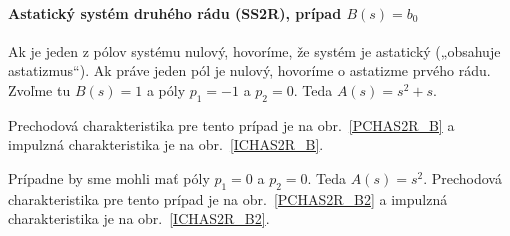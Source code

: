\documentclass[a4paper, 10pt, ]{article}
\begin{document}
\paragraph{Astatický systém druhého rádu (SS2R), prípad $B(s) = b_0$}

Ak je jeden z pólov systému nulový, hovoríme, že systém je astatický („obsahuje astatizmus“). Ak práve jeden pól je nulový, hovoríme o astatizme prvého rádu. Zvoľme tu $B(s) = 1$ a póly $p_1 = -1$ a $p_2 = 0$. Teda $A(s) = s^2 + s$.

Prechodová charakteristika pre tento prípad je na obr.~\ref{PCHAS2R_B} a impulzná charakteristika je na obr.~\ref{ICHAS2R_B}.

\begin{center}


	\label{PCHAS2R_B}

\end{center}

\begin{center}


	\label{ICHAS2R_B}

\end{center}

Prípadne by sme mohli mať póly $p_1 = 0$ a $p_2 = 0$. Teda $A(s) = s^2$. Prechodová charakteristika pre tento prípad je na obr.~\ref{PCHAS2R_B2} a impulzná charakteristika je na obr.~\ref{ICHAS2R_B2}.

\begin{center}


	\label{PCHAS2R_B2}

\end{center}

\begin{center}


	\label{ICHAS2R_B2}

\end{center}
\end{document}
